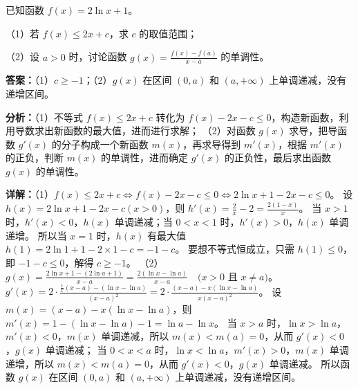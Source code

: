 \begin{question}[points=12]
已知函数 $f(x)=2\ln x+1$。

（1）若 $f(x)\le 2x+c$，求 $c$ 的取值范围；

（2）设 $a>0$ 时，讨论函数 $g(x)=\frac{f(x)-f(a)}{x-a}$ 的单调性。
\begin{solution}
\textbf{答案：}（1）$c\ge -1$；（2）$g(x)$ 在区间 $(0,a)$ 和 $(a,+\infty)$ 上单调递减，没有递增区间。

\textbf{分析：}（1）不等式 $f(x)\le 2x+c$ 转化为 $f(x)-2x-c\le 0$，构造新函数，利用导数求出新函数的最大值，进而进行求解；
（2）对函数 $g(x)$ 求导，把导函数 $g'(x)$ 的分子构成一个新函数 $m(x)$，再求导得到 $m'(x)$，根据 $m'(x)$ 的正负，判断 $m(x)$ 的单调性，进而确定 $g'(x)$ 的正负性，最后求出函数 $g(x)$ 的单调性。

\textbf{详解：}（1）$f(x)\le 2x+c \Leftrightarrow f(x)-2x-c\le 0 \Leftrightarrow 2\ln x+1-2x-c\le 0$。
设 $h(x)=2\ln x+1-2x-c(x>0)$，则 $h'(x)=\frac{2}{x}-2=\frac{2(1-x)}{x}$。
当 $x>1$ 时，$h'(x)<0$，$h(x)$ 单调递减；当 $0<x<1$ 时，$h'(x)>0$，$h(x)$ 单调递增。
所以当 $x=1$ 时，$h(x)$ 有最大值 $h(1)=2\ln1+1-2\times1-c=-1-c$。
要想不等式恒成立，只需 $h(1)\le 0$，即 $-1-c\le 0$，解得 $c\ge -1$。
（2）$g(x)=\frac{2\ln x+1-(2\ln a+1)}{x-a}=\frac{2(\ln x-\ln a)}{x-a} \quad (x>0$ 且 $x\neq a)$。
$g'(x)=2\cdot\frac{\frac{1}{x}(x-a)-(\ln x-\ln a)}{(x-a)^2}=2\cdot\frac{(x-a)-x(\ln x-\ln a)}{x(x-a)^2}$。
设 $m(x)= (x-a)-x(\ln x-\ln a)$，则 $m'(x)=1-(\ln x-\ln a)-1 = \ln a - \ln x$。
当 $x>a$ 时，$\ln x>\ln a$，$m'(x)<0$，$m(x)$ 单调递减，所以 $m(x)<m(a)=0$，从而 $g'(x)<0$，$g(x)$ 单调递减；
当 $0<x<a$ 时，$\ln x<\ln a$，$m'(x)>0$，$m(x)$ 单调递增，所以 $m(x)<m(a)=0$，从而 $g'(x)<0$，$g(x)$ 单调递减。
所以函数 $g(x)$ 在区间 $(0,a)$ 和 $(a,+\infty)$ 上单调递减，没有递增区间。
\end{solution}
\end{question}

